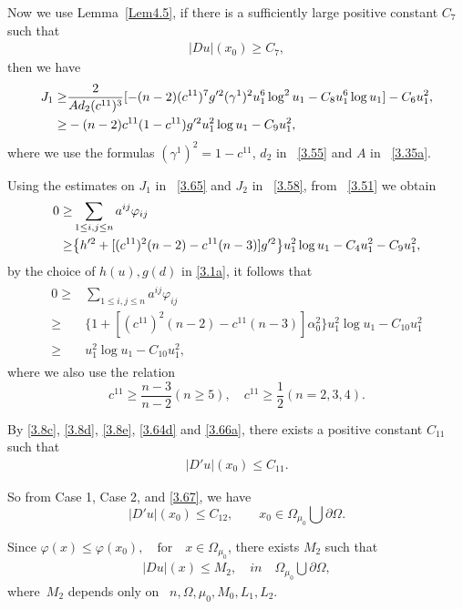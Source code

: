\documentclass[11pt]{amsart}
\numberwithin{equation}{section}
\begin{document}
Now we use  Lemma~\ref{Lem4.5}, if there is a sufficiently large positive constant $C_7$ such that
\begin{align}
|Du|(x_0) \ge C_7,\label{3.64d}
\end{align}
 then we have
\begin{align}\label{3.65}
J_{1}
\geq &\frac{2}{Ad_2(c^{11})^3}{[-(n-2)(c^{11})^7g'^2(\gamma^1)^2u_1^6\log^2 u_1-C_{8} u_1^6\log u_1]}-C_6u_1^2,\notag\\
\ge & -(n-2)c^{11}(1-c^{11})g'^2u_1^2\log u_1-C_9u_1^2,
\end{align}
where we use the formulas  $(\gamma^1)^2= 1-c^{11}$, $d_2$ in ~\eqref{3.55} and $A$ in ~\eqref{3.35a}.


Using the estimates on $J_1$ in ~\eqref{3.65} and  $J_2$ in ~\eqref{3.58}, from  ~\eqref{3.51} we obtain
\begin{align}\label{3.66}
0\geq &\sum_{1\leq i,j\leq n}a^{ij}\varphi_{ij}\notag\\
\geq & \big\{h'^2+[(c^{11})^2(n-2)-c^{11}(n-3)]g'^2\big\}u_1^2\log u_1-C_4u_1^2-C_9u_1^2,
\end{align}
by the choice of $h(u), g(d)$ in \eqref{3.1a},
it follows that
\begin{align}\label{3.66a}
\begin{split}
0\geq &\sum_{1\leq i,j\leq n}a^{ij}\varphi_{ij}\\
\ge & \big\{1+[(c^{11})^2(n-2)-c^{11}(n-3)]\alpha_0^2\big\}u_1^2\log u_1-C_{10}u_1^2\\
\geq & u_1^2\log u_1-C_{10}u_1^2,
\end{split}
\end{align}
where we also use the relation
$$c^{11}\geq\frac{n-3}{n-2}(n\ge 5 ),\quad c^{11}\geq\frac{1}{2}(n=2,3,4).$$

By \eqref{3.8c}, \eqref{3.8d}, \eqref{3.8e}, \eqref{3.64d} and \eqref{3.66a}, there exists a positive constant
$C_{11}$ such that
 \begin{align}\label{3.67}
 |D'u|(x_0)\leq C_{11}.
 \end{align}


 So from  Case 1, Case 2,  and \eqref{3.67}, we have
 $$|D'u|(x_0)\leq C_{12}, \quad \quad x_0\in\Omega_{\mu_0}\bigcup\partial\Omega.$$


Since $\varphi(x)\leq\varphi(x_0),\quad \text{for} \quad x\in \Omega_{\mu_0}$, there exists $M_2$ such that
\begin{align}\label{3.68}
|Du|(x)\leq M_2, \quad in\quad\Omega_{\mu_0}\bigcup\partial\Omega,
\end{align}
where~$M_2$ depends only on ~$n, \Omega, \mu_0, M_0,  L_1, L_2$.
\end{document}
